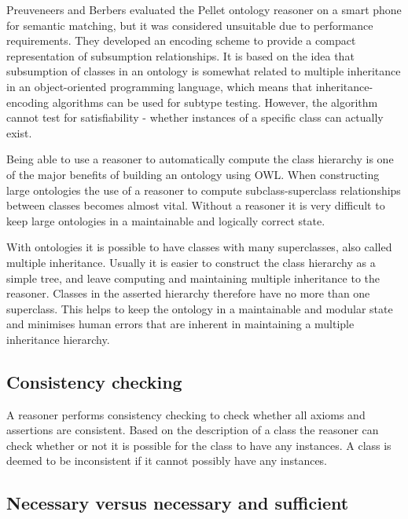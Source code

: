 Preuveneers and Berbers \cite{Preuveneers2008} evaluated the Pellet ontology reasoner on a smart phone for semantic matching, but it was considered unsuitable due to performance requirements. They developed an encoding scheme to provide a compact representation of subsumption relationships. It is based on the idea that subsumption of classes in an ontology is somewhat related to multiple inheritance in an object-oriented programming language, which means that in\-heritance-en\-coding algorithms can be used for subtype testing. However, the algorithm cannot test for satisfiability - whether instances of a specific class can actually exist. 

Being able to use a reasoner to automatically compute the class hierarchy is one of the major benefits of building an ontology using \ac{OWL}. When constructing large ontologies the use of a reasoner to compute subclass-superclass relationships between classes becomes almost vital. Without a reasoner it is very difficult to keep large ontologies in a maintainable and logically correct state. 

With ontologies it is possible to have classes with many superclasses, also called multiple inheritance. Usually it is easier to construct the class hierarchy as a simple tree, and leave computing and maintaining multiple inheritance to the reasoner. Classes in the asserted hierarchy therefore have no more than one superclass. This helps to keep the ontology in a maintainable and modular state and minimises human errors that are inherent in maintaining a multiple inheritance 
hierarchy.

\subsection{Consistency checking}

A reasoner performs consistency checking to check whether all axioms and assertions are consistent. Based on the description of a class the reasoner can check whether or not it is possible for the class to have any instances.  A class is deemed to be inconsistent if it cannot possibly have any instances. %

\subsection{Necessary versus necessary and sufficient}

